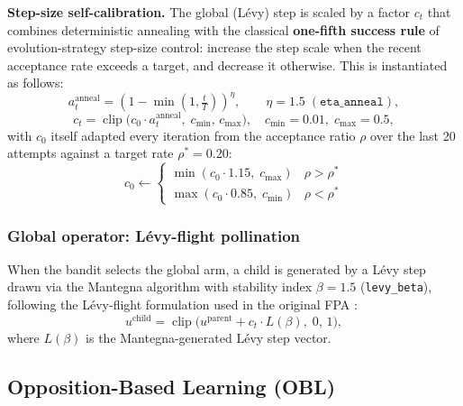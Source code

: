 \documentclass[preprint,12pt]{elsarticle}
\begin{document}
\textbf{Step-size self-calibration.} The global (L\'evy) step is scaled by a factor $c_t$ that combines deterministic annealing with the classical \textbf{one-fifth success rule} of evolution-strategy step-size control: increase the step scale when the recent acceptance rate exceeds a target, and decrease it otherwise. This is instantiated as follows:
\begin{equation}
a_t^{\text{anneal}} = \left(1 - \min\!\left(1, \tfrac{t}{T}\right)\right)^{\eta}, \qquad \eta = 1.5 \; (\texttt{eta\_anneal}),
\label{eq:anneal}
\end{equation}
\begin{equation}
c_t = \operatorname{clip}\big(c_0 \cdot a_t^{\text{anneal}},\; c_{\min},\, c_{\max}\big), \quad c_{\min}=0.01,\; c_{\max}=0.5,
\label{eq:stepscale}
\end{equation}
with $c_0$ itself adapted every iteration from the acceptance ratio $\rho$ over the last 20 attempts against a target rate $\rho^\ast = 0.20$:
\begin{equation}
c_0 \leftarrow \begin{cases} \min(c_0 \cdot 1.15,\; c_{\max}) & \rho > \rho^\ast \\ \max(c_0 \cdot 0.85,\; c_{\min}) & \rho < \rho^\ast \end{cases}
\label{eq:c0update}
\end{equation}

\subsubsection{Global operator: L\'evy-flight pollination}
\label{subsubsec3-1-1}
When the bandit selects the global arm, a child is generated by a L\'evy step drawn via the Mantegna algorithm with stability index $\beta = 1.5$ (\texttt{levy\_beta}), following the L\'evy-flight formulation used in the original FPA \cite{yang2012flower}:
\begin{equation}
u^{\text{child}} = \operatorname{clip}\big(u^{\text{parent}} + c_t \cdot L(\beta),\; 0,\, 1\big),
\label{eq:levy}
\end{equation}
where $L(\beta)$ is the Mantegna-generated L\'evy step vector.

\subsection{Opposition-Based Learning (OBL)}
\label{subsec3-2}
\end{document}
